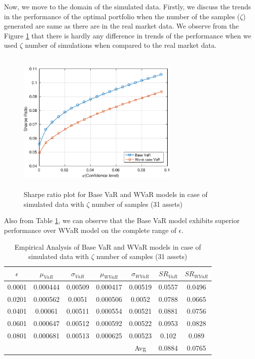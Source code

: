 Now, we move to the domain of the simulated data. Firstly, we discuss the trends in the performance of the optimal portfolio when the number of the samples ($\zeta$) generated are same as there are in the real market data. We observe from the Figure \ref{fig:5.2} that there is hardly any difference in trends of the performance when we used $\zeta$ number of simulations when compared to the real market data. 
\begin{figure}[!h]
\centering
\includegraphics[height=7.0cm,width=0.7\textwidth]{VaR/bse30_simulated/sr_exact_cheb.eps}
\caption{Sharpe ratio plot for Base VaR and WVaR models in case of simulated data with $\zeta$ number of samples (31 assets)}
\label{fig:5.2}
\end{figure}
Also from Table \ref{tab:5.2}, we can observe that the Base VaR model exhibits superior performance over WVaR model on the complete range of $\epsilon$.

\begin{table}[!h]
\centering
\captionsetup{justification=centering}
\begin{tabular}{||c|c|c|c|c|c|c||}
\hline
$\epsilon$ & $\mu_{VaR}$ & $\sigma_{VaR}$ & $\mu_{WVaR}$ & $\sigma_{WVaR}$ & $SR_{VaR}$ & $SR_{WVaR}$\\
\hline
0.0001 & 0.000444 & 0.00509 & 0.000417 & 0.00519 & 0.0557 & 0.0496 \\
0.0201 & 0.000562 & 0.0051 & 0.000506 & 0.0052 & 0.0788 & 0.0665 \\
0.0401 & 0.00061 & 0.00511 & 0.000554 & 0.00521 & 0.0881 & 0.0756 \\
0.0601 & 0.000647 & 0.00512 & 0.000592 & 0.00522 & 0.0953 & 0.0828 \\
0.0801 & 0.000681 & 0.00513 & 0.000625 & 0.00523 & 0.102 & 0.089 \\
\hline
& & & & Avg & 0.0884 & 0.0765 \\
\hline
\end{tabular}
\caption{Empirical Analysis of Base VaR and WVaR models in case of simulated data with $\zeta$ number of samples (31 assets)}
\label{tab:5.2}
\end{table}

